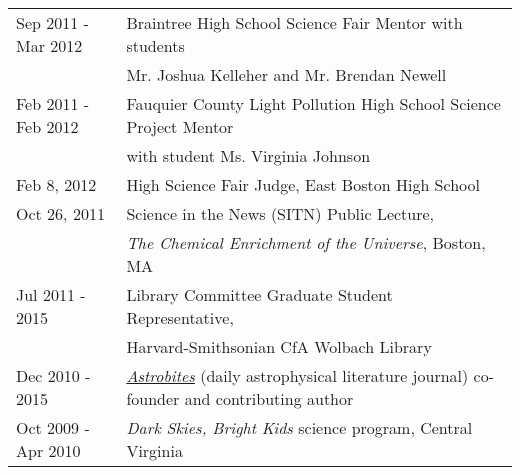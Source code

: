 \begin{tabular*}{\textwidth}{@{\hspace{10pt}}p{1.4in}l}
Sep 2011 - Mar 2012 & Braintree High School Science Fair Mentor with students\\
& Mr. Joshua Kelleher and Mr. Brendan Newell\\
Feb 2011 - Feb 2012 & Fauquier County Light Pollution High School Science Project Mentor\\
& with student Ms. Virginia Johnson\\
Feb 8, 2012 & High Science Fair Judge, East Boston High School\\
Oct 26, 2011 & Science in the News (SITN) Public Lecture,\\
& \emph{The Chemical Enrichment of the Universe}, Boston, MA\\
Jul 2011 - 2015 & Library Committee Graduate Student Representative,\\
& Harvard-Smithsonian CfA Wolbach Library\\
Dec 2010 - 2015 & \href{http://astrobites.com/}{\emph{Astrobites}} (daily astrophysical literature journal) co-founder and contributing author\\
Oct 2009 - Apr 2010 & \emph{Dark Skies, Bright Kids} science program, Central Virginia\\
\end{tabular*}
